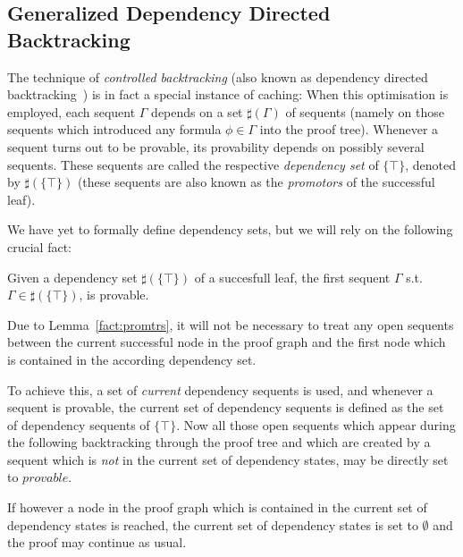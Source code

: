 \documentclass{llncs}
\begin{document}
\subsection{Generalized Dependency Directed Backtracking}

The technique of \emph{controlled backtracking} (also known as dependency directed
backtracking~\cite{HorrocksPatelSchneider99}) is in fact a special instance of caching: When this optimisation is
employed, each sequent $\Gamma$ depends on a set $\sharp(\Gamma)$ of
sequents (namely on those sequents which introduced any formula $\phi\in\Gamma$ into the proof tree).
Whenever a sequent turns out to be provable, its provability depends
on possibly several sequents. These sequents are called the respective
\emph{dependency set} of $\{\top\}$, denoted by $\sharp(\{\top\})$ (these sequents are 
also known as the \emph{promotors} of the successful leaf).

We have yet to formally define dependency sets, but we will rely on the following
crucial fact:

\begin{lemma} Given a dependency set $\sharp(\{\top\})$ of a succesfull leaf, the first
sequent $\Gamma$ s.t. $\Gamma\in \sharp(\{\top\})$, is provable.
\label{fact:promtrs}
\end{lemma}

Due to Lemma~\ref{fact:promtrs}, it will
not be necessary to treat any open sequents between the current successful node in the
proof graph and the first node which is contained in the according dependency set.

To achieve this, a set of \emph{current} dependency sequents is used, and whenever a
sequent is provable, the current set of dependency sequents is defined as the set of
dependency sequents of $\{\top\}$. Now all those open sequents which
appear during the following backtracking through the proof tree and which
are created by a sequent which is \emph{not} in the current set of dependency states,
may be directly set to $provable$.

If however a node in the proof graph which is contained in the current set of dependency
states is reached, the current set of dependency states is set to $\emptyset$ and the
proof may continue as usual.
\end{document}
